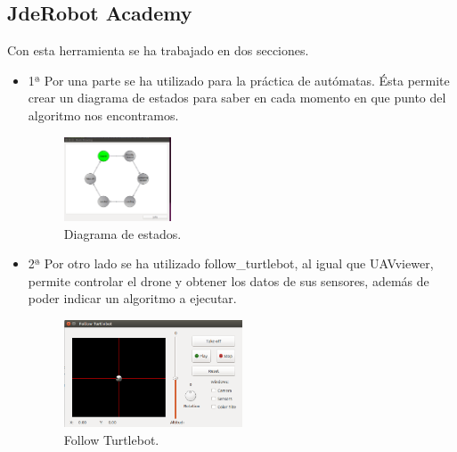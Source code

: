\subsection{JdeRobot Academy}
\label{sec.JdeRobotAcademy}
\hspace{1 cm} Con esta herramienta se ha trabajado en dos secciones.
\begin{itemize}
\item 1ª Por una parte se ha utilizado para la pr\'actica de aut\'omatas. \'Esta permite crear un diagrama de estados para saber en cada momento en que punto del algoritmo nos encontramos.

\begin{figure}[ht]
	\centering
		\includegraphics[width=0.3\textwidth]{imgs/states.eps}
		\caption{Diagrama de estados.}
	\label{fig:Diag_estados}
\end{figure}

\item 2ª Por otro lado se ha utilizado follow\_turtlebot, al igual que UAVviewer, permite controlar el drone y obtener los datos de sus sensores, adem\'as de poder indicar un algoritmo a ejecutar.
 \begin{figure}[H]
	\centering
		\includegraphics[width=0.5\textwidth]{imgs/follow_turtlebot.png}
		\caption{Follow Turtlebot.}
	\label{fig:FollowTurtlebot}
\end{figure}


\end{itemize}

